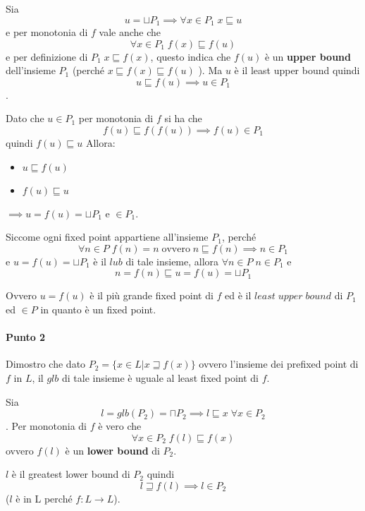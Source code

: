 \documentclass{article}
\newcommand{\pd}{P_{2}}
\begin{document}

Sia $$u=\sqcup P_{1} \implies \forall x \in P_{1} \; x \sqsubseteq u$$
 e per monotonia di $f$ vale anche che $$\forall x \in P_{1} \; f(x)\sqsubseteq f(u)$$ e per definizione di $P_{1}\; x \sqsubseteq f(x)$, questo indica che $f(u)$ è un \textbf{upper bound} dell'insieme $P_{1}$ (perché $x \sqsubseteq f(x) \sqsubseteq f(u)$ ). Ma $u$ è il least upper bound quindi $$u \sqsubseteq f(u) \implies u \in P_{1}$$.

Dato che $u \in P_{1}$ per monotonia di $f$ si ha che $$f(u)\sqsubseteq f(f(u)) \implies f(u) \in P_{1}$$
 quindi $f(u)\sqsubseteq u$ Allora:
\begin{itemize}
    \item $u\sqsubseteq f(u)$
    \item $f(u)\sqsubseteq u$
\end{itemize}
$\implies u=f(u)=\sqcup P_{1}$ e $\in P_{1}$.

Siccome ogni fixed point appartiene all'insieme $P_{1}$, perché $$\forall n \in P \; f(n)=n  \;\text{ovvero} \; n \sqsubseteq f(n) \implies n \in P_{1}$$ e $u=f(u)=\sqcup P_{1}$ è il $lub$ di tale insieme, allora $\forall n \in P \; n \in P_{1} $ e $$n = f(n) \sqsubseteq u = f(u) =\sqcup P_{1}$$

Ovvero $u=f(u)$  è il più grande fixed point di $f$ ed è il $least\; upper\; bound$ di $P_{1}$ ed $\in P$ in quanto è un fixed point. 

\paragraph{Punto 2} Dimostro che dato $\pd = \{x \in L | x \sqsupseteq f(x) \}$ ovvero l'insieme dei prefixed point di $f$ in $L$, il $glb$ di tale insieme è uguale al least fixed point di $f$.


Sia $$l =glb(\pd)= \sqcap \pd \implies l \sqsubseteq x \; \forall x \in \pd$$. Per monotonia di $f$ è vero che $$\forall x \in \pd \; f(l) \sqsubseteq f(x)$$ ovvero $f(l)$ è un \textbf{lower bound} di $\pd$.

$l$ è il greatest lower bound di $\pd$ quindi $$l \sqsupseteq f(l) \implies l \in \pd$$ ($l$ è in L perché $f:L\to L$).
\end{document}
